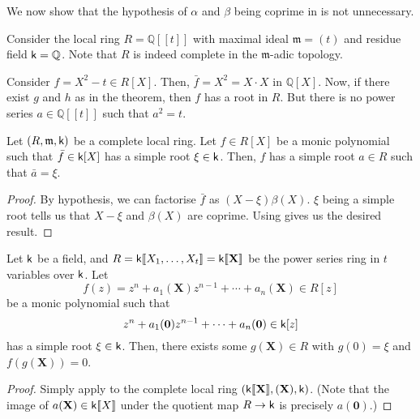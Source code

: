 \begin{ex} \label{ex:hensel-not-coprime}
	We now show that the hypothesis of $\alpha$ and $\beta$ being coprime in  is not unnecessary. 

	Consider the local ring $R = \mathbb{Q}[\![t]\!]$ with maximal ideal $\mathfrak{m} = (t)$ and residue field $\mathsf{k} = \mathbb{Q}$. Note that $R$ is indeed complete in the $\mathfrak{m}$-adic topology.

	Consider $f = X^{2} - t \in R[X]$. Then, $\bar{f} = X^{2} = X \cdot X$ in $\mathbb{Q}[X]$. Now, if there exist $g$ and $h$ as in the theorem, then $f$ has a root in $R$. But there is no power series $a \in \mathbb{Q}[\![t]\!]$ such that $a^{2} = t$.
\end{ex}

\begin{cor} \label{cor:complete-local-ring-simple-root-lift}
	Let $(R, \mathfrak{m}, \mathsf{k})$ be a complete local ring. Let $f \in R[X]$ be a monic polynomial such that $\bar{f} \in \mathsf{k}[X]$ has a simple root $\xi \in \mathsf{k}$. Then, $f$ has a simple root $a \in R$ such that $\bar{a} = \xi$.
\end{cor}
\begin{proof} 
	By hypothesis, we can factorise $\bar{f}$ as $(X - \xi)\beta(X)$. $\xi$ being a simple root tells us that $X - \xi$ and $\beta(X)$ are coprime. Using  gives us the desired result.
\end{proof}

\begin{cor}
	Let $\mathsf{k}$ be a field, and $R = \mathsf{k}[\![X_{1}, \ldots, X_{t}]\!] = \mathsf{k}[\![\mathbf{X}]\!]$ be the power series ring in $t$ variables over $\mathsf{k}$. Let
	\begin{equation*} 
		f(z) = z^{n} + a_{1}(\mathbf{X}) z^{n - 1} + \cdots + a_{n}(\mathbf{X}) \in R[z]
	\end{equation*}
	be a monic polynomial such that
	\begin{equation*} 
		z^{n} + a_{1}(\mathbf{0}) z^{n - 1} + \cdots + a_{n}(\mathbf{0}) \in \mathsf{k}[z]
	\end{equation*}
	has a simple root $\xi \in \mathsf{k}$. Then, there exists some $g(\mathbf{X}) \in R$ with $g(0) = \xi$ and $f(g(\mathbf{X})) = 0$.
\end{cor}
\begin{proof} 
	Simply apply  to the complete local ring $(\mathsf{k}[\![\mathbf{X}]\!], (\mathbf{X}), \mathsf{k})$. (Note that the image of $a(\mathbf{X}) \in \mathsf{k}[\![X]\!]$ under the quotient map $R \to \mathsf{k}$ is precisely $a(\mathbf{0})$.)
\end{proof}

